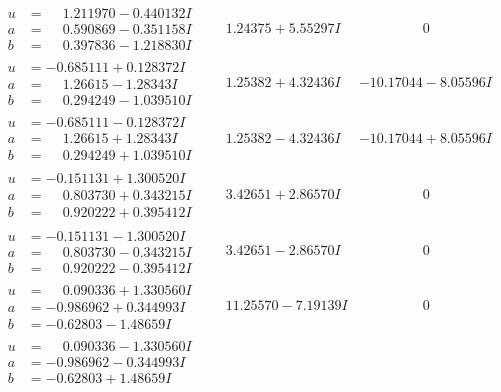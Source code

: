 \documentclass[1p]{elsarticle_modified}
\theoremstyle{definition}
\begin{document}
$$\begin{array}{c|c|c}
\begin{aligned}
u &= \phantom{-}1.211970 - 0.440132 I \\
a &= \phantom{-}0.590869 - 0.351158 I \\
b &= \phantom{-}0.397836 - 1.218830 I\end{aligned}
 & \phantom{-}1.24375 + 5.55297 I & \phantom{-0.000000 } 0 \\ \hline\begin{aligned}
u &= -0.685111 + 0.128372 I \\
a &= \phantom{-}1.26615 - 1.28343 I \\
b &= \phantom{-}0.294249 - 1.039510 I\end{aligned}
 & \phantom{-}1.25382 + 4.32436 I & -10.17044 - 8.05596 I \\ \hline\begin{aligned}
u &= -0.685111 - 0.128372 I \\
a &= \phantom{-}1.26615 + 1.28343 I \\
b &= \phantom{-}0.294249 + 1.039510 I\end{aligned}
 & \phantom{-}1.25382 - 4.32436 I & -10.17044 + 8.05596 I \\ \hline\begin{aligned}
u &= -0.151131 + 1.300520 I \\
a &= \phantom{-}0.803730 + 0.343215 I \\
b &= \phantom{-}0.920222 + 0.395412 I\end{aligned}
 & \phantom{-}3.42651 + 2.86570 I & \phantom{-0.000000 } 0 \\ \hline\begin{aligned}
u &= -0.151131 - 1.300520 I \\
a &= \phantom{-}0.803730 - 0.343215 I \\
b &= \phantom{-}0.920222 - 0.395412 I\end{aligned}
 & \phantom{-}3.42651 - 2.86570 I & \phantom{-0.000000 } 0 \\ \hline\begin{aligned}
u &= \phantom{-}0.090336 + 1.330560 I \\
a &= -0.986962 + 0.344993 I \\
b &= -0.62803 - 1.48659 I\end{aligned}
 & \phantom{-}11.25570 - 7.19139 I & \phantom{-0.000000 } 0 \\ \hline\begin{aligned}
u &= \phantom{-}0.090336 - 1.330560 I \\
a &= -0.986962 - 0.344993 I \\
b &= -0.62803 + 1.48659 I\end{aligned}

\end{array}$$
\end{document}
